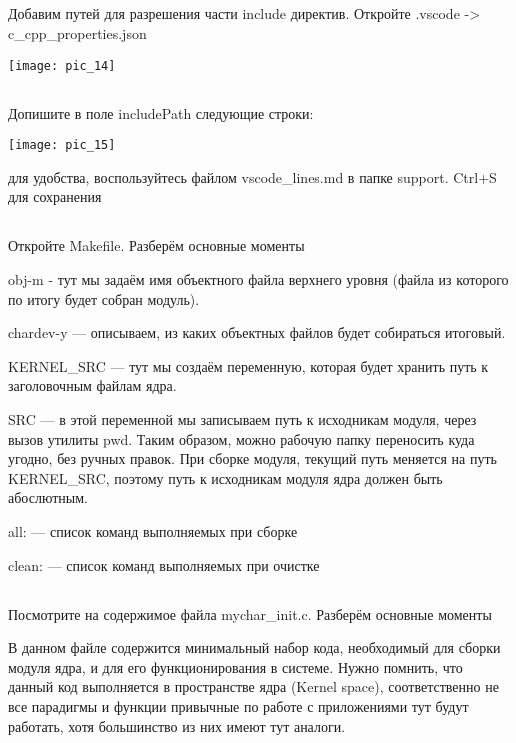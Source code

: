 \subsection{}Добавим путей для разрешения части include директив. Откройте .vscode -> c\_cpp\_properties.json
\begin{center}
	\texttt{[image: pic\_14]}
\end{center}

\subsection{}Допишите в поле includePath следующие строки:\\
\begin{center}
	\texttt{[image: pic\_15]}
\end{center}
для удобства, воспользуйтесь файлом vscode\_lines.md в папке support. Ctrl+S для сохранения

\subsection{}Откройте Makefile. Разберём основные моменты

obj-m  - тут мы задаём имя объектного файла верхнего уровня (файла из которого по итогу будет собран модуль). 

chardev-y — описываем, из каких объектных файлов будет собираться итоговый. 

KERNEL\_SRC — тут мы создаём переменную, которая будет хранить путь к заголовочным файлам ядра.

SRC — в этой переменной мы записываем путь к исходникам модуля, через вызов утилиты pwd. Таким образом, можно рабочую папку переносить куда угодно, без ручных правок. При сборке модуля, текущий путь меняется на путь KERNEL\_SRC, поэтому путь к исходникам модуля ядра должен быть абослютным.

all: — список команд выполняемых при сборке 

clean: — список команд выполняемых при очистке

\subsection{}Посмотрите на содержимое файла mychar\_init.c. Разберём основные моменты

В данном файле содержится минимальный набор кода, необходимый для сборки модуля ядра, и для его функционирования в системе. Нужно помнить, что данный код выполняется в пространстве ядра (Kernel space), соответственно не все парадигмы и функции привычные по работе с приложениями тут будут работать, хотя большинство из них имеют тут аналоги.

